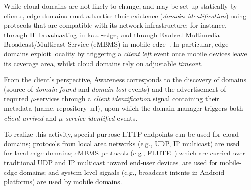 While cloud domains are not likely to change, and may be set-up statically by clients,%
edge domains must advertise their existence (\textit{domain identification}) using protocols that are compatible with its network infrastructure: for instance, through IP broadcasting in local-edge, and through Evolved Multimedia Broadcast/Multicast Service (eMBMS) in mobile-edge~\cite{lecompte2012evolved,etsimec16:03}. 
In particular, edge domains exploit locality by triggering a \textit{client left} event once mobile devices leave its coverage area, whilst cloud domains rely on adjustable \textit{timeout}.%





%	
%	

From the client's perspective, Awareness corresponds to the discovery of domains (source of \textit{domain found} and \textit{domain lost} events) and the advertisement of required $\mu$-services through a \textit{client identification} signal containing their metadata (name, repository url), upon which the domain manager triggers both \textit{client arrived} and \textit{$\mu$-service identified} events.%

To realize this activity, special purpose HTTP endpoints can be used for cloud domains; protocols from local area networks (e.g., UDP, IP multicast) are used for local-edge domains; eMBMS protocols (e.g., FLUTE~\cite{lecompte2012evolved}) which are carried over traditional UDP and IP multicast toward end-user devices, are used for mobile-edge domains; and system-level signals (e.g., broadcast intents in Android platforms) are used by mobile domains.



